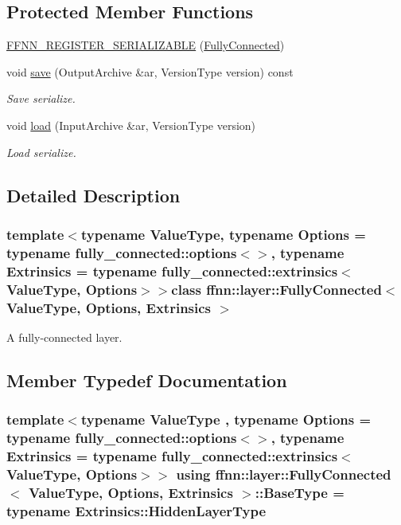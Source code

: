 \subsection*{Protected Member Functions}
\begin{DoxyCompactItemize}
\item 
\hyperlink{classffnn_1_1layer_1_1_fully_connected_ad66275e42a79a3f10b34828b98d964ab}{F\-F\-N\-N\-\_\-\-R\-E\-G\-I\-S\-T\-E\-R\-\_\-\-S\-E\-R\-I\-A\-L\-I\-Z\-A\-B\-L\-E} (\hyperlink{classffnn_1_1layer_1_1_fully_connected}{Fully\-Connected})
\item 
void \hyperlink{classffnn_1_1layer_1_1_fully_connected_a471dc3b71aa344ca93274bcda02fe875}{save} (Output\-Archive \&ar, Version\-Type version) const 
\begin{DoxyCompactList}\small\item\em Save serialize. \end{DoxyCompactList}\item 
void \hyperlink{classffnn_1_1layer_1_1_fully_connected_aaf538f819eff90612aaf815007d77890}{load} (Input\-Archive \&ar, Version\-Type version)
\begin{DoxyCompactList}\small\item\em Load serialize. \end{DoxyCompactList}\end{DoxyCompactItemize}


\subsection{Detailed Description}
\subsubsection*{template$<$typename Value\-Type, typename Options = typename fully\-\_\-connected\-::options$<$$>$, typename Extrinsics = typename fully\-\_\-connected\-::extrinsics$<$\-Value\-Type, Options$>$$>$class ffnn\-::layer\-::\-Fully\-Connected$<$ Value\-Type, Options, Extrinsics $>$}

A fully-\/connected layer. 

\subsection{Member Typedef Documentation}
\hypertarget{classffnn_1_1layer_1_1_fully_connected_afd4e92710e0f74a32ea0ca1a44925b48}{
\subsubsection[{Base\-Type}]{\setlength{\rightskip}{0pt plus 5cm}template$<$typename Value\-Type , typename Options  = typename fully\-\_\-connected\-::options$<$$>$, typename Extrinsics  = typename fully\-\_\-connected\-::extrinsics$<$\-Value\-Type, Options$>$$>$ using {\bf ffnn\-::layer\-::\-Fully\-Connected}$<$ Value\-Type, Options, Extrinsics $>$\-::{\bf Base\-Type} =  typename Extrinsics\-::\-Hidden\-Layer\-Type}}\label{classffnn_1_1layer_1_1_fully_connected_afd4e92710e0f74a32ea0ca1a44925b48}


